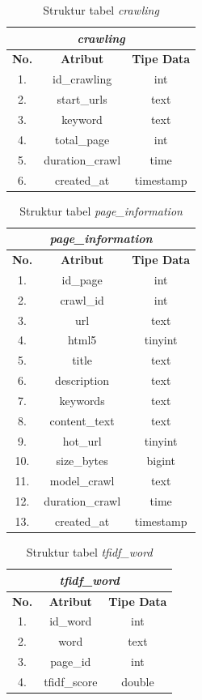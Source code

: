 \begin{table}[h!]
	\centering
	\caption{Struktur tabel \textit{crawling}}
	\label{table:entity_crawling}
	\begin{tabular}{|c|c|c|}
		\hline
		\multicolumn{3}{|c|}{\textit{crawling}} \\
		\hline
		\textbf{No.} & \textbf{Atribut} & \textbf{Tipe Data} \\
		\hline
		1. & id\_crawling & int \\
		2. & start\_urls & text \\
		3. & keyword & text \\
		4. & total\_page & int \\
		5. & duration\_crawl & time \\
		6. & created\_at & timestamp \\
		\hline
	\end{tabular}
\end{table}
 
 \begin{table}[h!]
	\centering
	\caption{Struktur tabel \textit{page\_information}}
	\label{table:entity_page_information}
	\begin{tabular}{|c|c|c|}
		\hline
		\multicolumn{3}{|c|}{\textit{page\_information}} \\
		\hline
		\textbf{No.} & \textbf{Atribut} & \textbf{Tipe Data} \\
		\hline
		1. & id\_page & int \\
		2. & crawl\_id & int \\
		3. & url & text \\
		4. & html5 & tinyint \\
		5. & title & text \\
		6. & description & text \\
		7. & keywords & text \\
		8. & content\_text & text \\
		9. & hot\_url & tinyint \\
		10. & size\_bytes & bigint \\
		11. & model\_crawl & text \\
		12. & duration\_crawl & time \\
		13. & created\_at & timestamp \\
		\hline
	\end{tabular}
\end{table}

\begin{table}[h!]
	\centering
	\caption{Struktur tabel \textit{tfidf\_word}}
	\label{table:tfidf_word}
	\begin{tabular}{|c|c|c|}
		\hline
		\multicolumn{3}{|c|}{\textit{tfidf\_word}} \\
		\hline
		\textbf{No.} & \textbf{Atribut} & \textbf{Tipe Data} \\
		\hline
		1. & id\_word & int \\
		2. & word & text \\
		3. & page\_id & int \\
		4. & tfidf\_score & double \\
		\hline
	\end{tabular}
\end{table}

